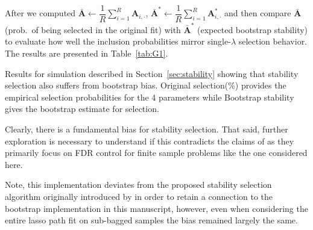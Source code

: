After we computed $\bar{\mathbf A}\gets\dfrac1R\sum_{i=1}^{R}\mathbf A_{i,\cdot}$,  \; $\bar{\mathbf A}^{\!*}\gets\dfrac1R\sum_{i=1}^{R}\mathbf A^{\!*}_{i,\cdot}$ and then compare $\bar{\mathbf A}$ (prob.\ of being selected in the original fit) with $\bar{\mathbf A}^{\!*}$ (expected bootstrap stability) to evaluate how well the inclusion probabilities mirror single-$\lambda$ selection behavior. The results are presented in Table~\ref{tab:G1}.

\begin{table}[hbtp]
  \centering
  
  \caption{\label{tab:G1} Results for simulation described in Section~\ref{sec:stability} showing that stability selection also suffers from bootstrap bias. Original selection(\%) provides the empirical selection probabilities for the 4 parameters while Bootstrap stability gives the bootstrap estimate for selection.}
\end{table}

Clearly, there is a fundamental bias for stability selection. That said, further exploration is necessary to understand if this contradicts the claims of \cite{Meinshausen2010} as they primarily focus on FDR control for finite sample problems like the one considered here.

Note, this implementation deviates from the proposed stability selection algorithm originally introduced by \cite{Meinshausen2010} in order to retain a connection to the bootstrap implementation in this manuscript, however, even when considering the entire lasso path fit on sub-bagged samples the bias remained largely the same.
